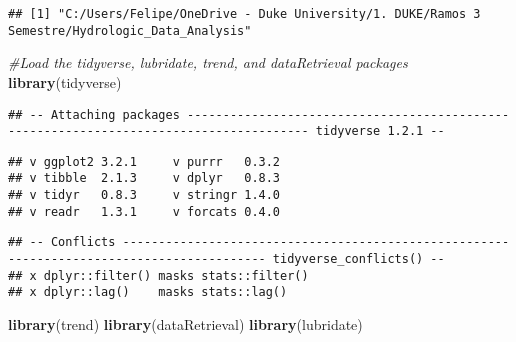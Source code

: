 \documentclass[]{article}
\newenvironment{Shaded}{\begin{snugshade}}{\end{snugshade}}
\newcommand{\CommentTok}[1]{\textcolor[rgb]{0.56,0.35,0.01}{\textit{#1}}}
\newcommand{\DataTypeTok}[1]{\textcolor[rgb]{0.13,0.29,0.53}{#1}}
\newcommand{\KeywordTok}[1]{\textcolor[rgb]{0.13,0.29,0.53}{\textbf{#1}}}
\newcommand{\NormalTok}[1]{#1}
\newcommand{\OperatorTok}[1]{\textcolor[rgb]{0.81,0.36,0.00}{\textbf{#1}}}
\newcommand{\OtherTok}[1]{\textcolor[rgb]{0.56,0.35,0.01}{#1}}
\begin{document}
\begin{Shaded}
\end{Shaded}

\begin{verbatim}
## [1] "C:/Users/Felipe/OneDrive - Duke University/1. DUKE/Ramos 3 Semestre/Hydrologic_Data_Analysis"
\end{verbatim}

\begin{Shaded}
\begin{Highlighting}[]
\CommentTok{#Load the tidyverse, lubridate, trend, and dataRetrieval packages}
\KeywordTok{library}\NormalTok{(tidyverse)}
\end{Highlighting}
\end{Shaded}

\begin{verbatim}
## -- Attaching packages --------------------------------------------------------------------------------------- tidyverse 1.2.1 --
\end{verbatim}

\begin{verbatim}
## v ggplot2 3.2.1     v purrr   0.3.2
## v tibble  2.1.3     v dplyr   0.8.3
## v tidyr   0.8.3     v stringr 1.4.0
## v readr   1.3.1     v forcats 0.4.0
\end{verbatim}

\begin{verbatim}
## -- Conflicts ------------------------------------------------------------------------------------------ tidyverse_conflicts() --
## x dplyr::filter() masks stats::filter()
## x dplyr::lag()    masks stats::lag()
\end{verbatim}

\begin{Shaded}
\begin{Highlighting}[]
\KeywordTok{library}\NormalTok{(trend)}
\KeywordTok{library}\NormalTok{(dataRetrieval)}
\KeywordTok{library}\NormalTok{(lubridate)}
\end{Highlighting}
\end{Shaded}
\end{document}
